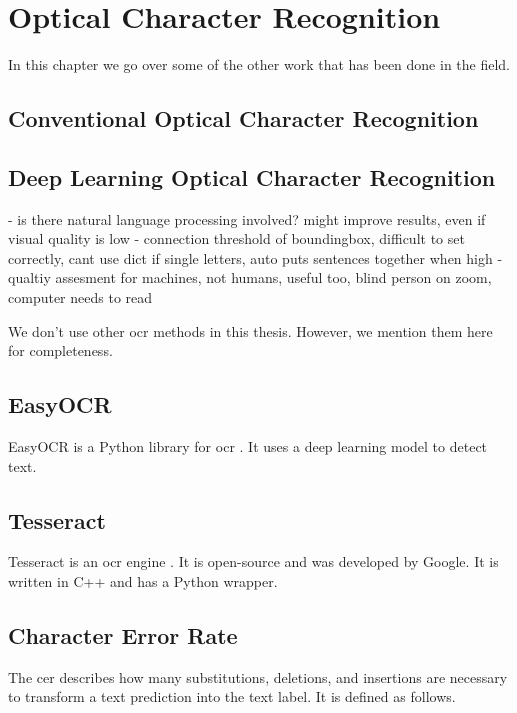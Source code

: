\chapter{Optical Character Recognition}
\label{chap:ocr}

In this chapter we go over some of the other work that has been done in the field.

\cite{ocr_survey_2017}

\section{Conventional Optical Character Recognition}

\section{Deep Learning Optical Character Recognition}

- is there natural language processing involved? might improve results, even if visual quality is low
- connection threshold of boundingbox, difficult to set correctly, cant use dict if single letters, auto puts sentences together when high
- qualtiy assesment for machines, not humans, useful too, blind person on zoom, computer needs to read

We don't use other \gls{ocr} methods in this thesis.
However, we mention them here for completeness.

\section{EasyOCR}
\label{subsec:easyocr}

EasyOCR is a Python library for \gls{ocr} \cite{easyocr_2020}. It uses a deep learning model to detect text.

\section{Tesseract}
\label{subsec:tesseract}

Tesseract is an \gls{ocr} engine \cite{tesseract_2007}. It is open-source and was developed by Google. It is written in C++ and has a Python wrapper.


\section{Character Error Rate}
\label{subsec:cer}

The \gls{cer} \cite{cer_2022} describes how many substitutions, deletions, and insertions are necessary to transform a text prediction into the text label.
It is defined as follows.

